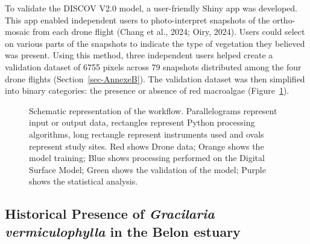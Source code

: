 \documentclass[
  letterpaper,
  11pt,
  english,
  singlespacing,
  headsepline]{MastersDoctoralThesis}
\begin{document}
\begin{spacing}{1.5}
To validate the DISCOV V2.0 model, a user-friendly Shiny app was
developed. This app enabled independent users to photo-interpret
snapshots of the ortho-mosaic from each drone flight (Chang et al.,
2024; Oiry, 2024). Users could select on various parts of the snapshots
to indicate the type of vegetation they believed was present. Using this
method, three independent users helped create a validation dataset of
6755 pixels across 79 snapshots distributed among the four drone flights
(Section~\ref{sec-AnnexeB}). The validation dataset was then simplified
into binary categories: the presence or absence of red macroalgae
(Figure~\ref{fig-Workflow_g}).

\begin{figure}


\caption{\label{fig-Workflow_g}Schematic representation of the workflow.
Parallelograms represent input or output data, rectangles represent
Python processing algorithms, long rectangle represent instruments used
and ovals represent study sites. Red shows Drone data; Orange shows the
model training; Blue shows processing performed on the Digital Surface
Model; Green shows the validation of the model; Purple shows the
statistical analysis.}

\end{figure}%

\subsection{\texorpdfstring{Historical Presence of \emph{Gracilaria
vermiculophylla} in the Belon
estuary}{Historical Presence of Gracilaria vermiculophylla in the Belon estuary}}\label{historical-presence-of-gracilaria-vermiculophylla-in-the-belon-estuary}


\end{spacing}
\end{document}
